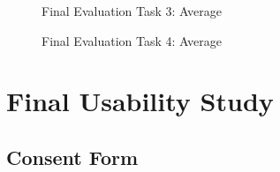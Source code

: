 \begin{figure}[!h]
  \centering
  \begin{minipage}[b]{0.47\textwidth}
    \caption{Final Evaluation Task 3: Average}
  \end{minipage}
  \hfill
  \begin{minipage}[b]{0.47\textwidth}
  \caption{Final Evaluation Task 4: Average}
  \end{minipage}
\end{figure}





\chapter{Final Usability Study} \label{chp:finalUsabilityStudy}

\newpage
\section{Consent Form}
\vspace{3em}

